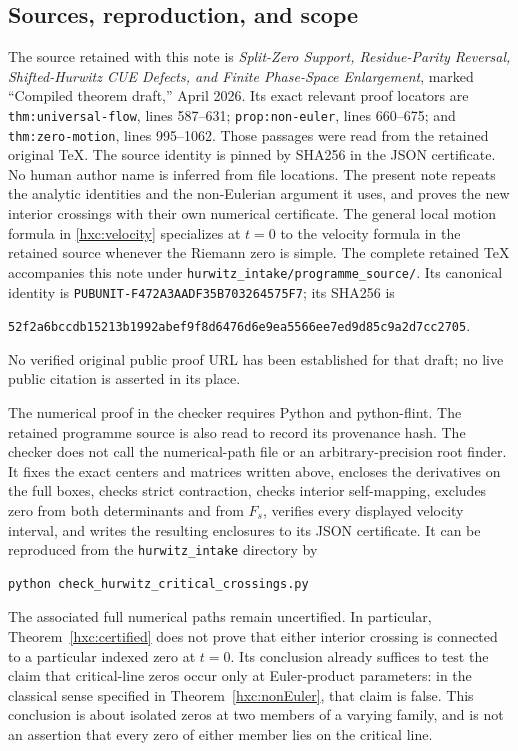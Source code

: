 \subsection{Sources, reproduction, and scope}

The source retained with this note is
\emph{Split-Zero Support, Residue-Parity Reversal, Shifted-Hurwitz CUE
Defects, and Finite Phase-Space Enlargement}, marked ``Compiled theorem
draft,'' April 2026. Its exact relevant proof locators are
\texttt{thm:universal-flow}, lines 587--631;
\texttt{prop:non-euler}, lines 660--675; and
\texttt{thm:zero-motion}, lines 995--1062. Those passages were read
from the retained original TeX. The source identity is pinned by SHA256
in the JSON certificate. No human author name is inferred from file
locations. The present note repeats the analytic identities and the
non-Eulerian argument it uses, and proves the new interior crossings
with their own numerical certificate. The general local motion formula
in \eqref{hxc:velocity} specializes at \(t=0\) to the velocity formula
in the retained source whenever the Riemann zero is simple.
The complete retained TeX accompanies this note under
\texttt{hurwitz\_\allowbreak intake/programme\_\allowbreak source/}. Its canonical identity is
\texttt{PUBUNIT-F472A3AADF35B703264575F7}; its SHA256 is
\begin{center}\small\ttfamily
\nolinkurl{52f2a6bccdb15213b1992abef9f8d6476d6e9ea5566ee7ed9d85c9a2d7cc2705}.
\end{center}
No verified original public proof URL has been established for that
draft; no live public citation is asserted in its place.

The numerical proof in the checker requires Python and python-flint.
The retained programme source is also read to record its provenance
hash. The checker
does not call the numerical-path file or an arbitrary-precision root
finder. It fixes the exact centers and matrices written above,
encloses the derivatives on the full boxes, checks strict contraction,
checks interior self-mapping, excludes zero from both determinants and
from \(F_s\), verifies every displayed velocity interval, and writes
the resulting enclosures to its JSON certificate. It can be reproduced
from the \texttt{hurwitz\_\allowbreak intake} directory by
\begin{verbatim}
python check_hurwitz_critical_crossings.py
\end{verbatim}
The associated full numerical paths remain uncertified. In particular,
Theorem~\ref{hxc:certified} does not prove that either interior crossing
is connected to a particular indexed zero at \(t=0\). Its conclusion
already suffices to test the claim that critical-line zeros occur only
at Euler-product parameters: in the classical sense specified in
Theorem~\ref{hxc:nonEuler}, that claim is false. This conclusion is
about isolated zeros at two members of a varying family, and is not an
assertion that every zero of either member lies on the critical line.

